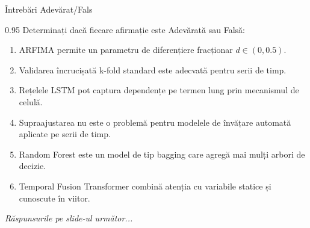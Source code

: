 \documentclass[9pt, aspectratio=169, t]{beamer}
\begin{document}
\begin{frame}{Întrebări Adevărat/Fals}
    \begin{cminipage}{0.95\textwidth}
    Determinați dacă fiecare afirmație este Adevărată sau Falsă:

    \vspace{0.3cm}
    \begin{enumerate}\setlength{\itemsep}{0pt}
        \item ARFIMA permite un parametru de diferențiere fracționar $d \in (0, 0.5)$.
        \item Validarea încrucișată k-fold standard este adecvată pentru serii de timp.
        \item Rețelele LSTM pot captura dependențe pe termen lung prin mecanismul de celulă.
        \item Supraajustarea nu este o problemă pentru modelele de învățare automată aplicate pe serii de timp.
        \item Random Forest este un model de tip bagging care agregă mai mulți arbori de decizie.
        \item Temporal Fusion Transformer combină atenția cu variabile statice și cunoscute în viitor.
    \end{enumerate}

    \vspace{0.3cm}
    \begin{flushright}\textit{Răspunsurile pe slide-ul următor...}\end{flushright}
    \end{cminipage}
\end{frame}
\end{document}
